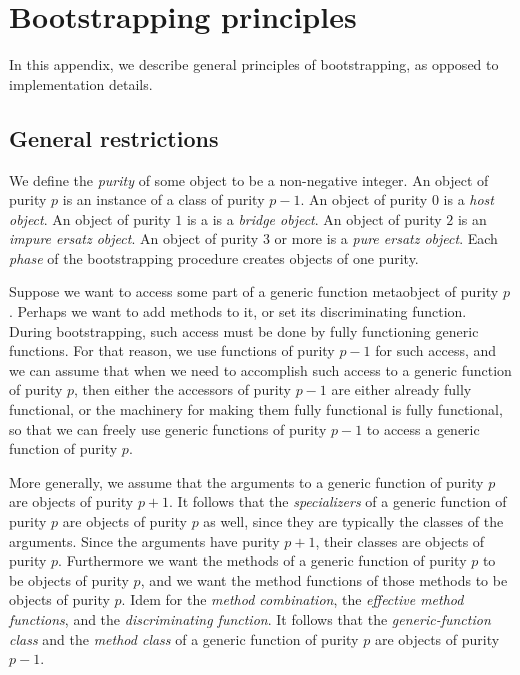 \chapter{Bootstrapping principles}

In this appendix, we describe general principles of bootstrapping, as
opposed to implementation details.

\section{General restrictions}

We define the \emph{purity} of some object to be a non-negative
integer.  An object of purity $p$ is an instance of a class of purity
$p-1$.  An object of purity $0$ is a \emph{host object}.  An object of
purity $1$ is a is a \emph{bridge object}.  An object of purity $2$ is
an \emph{impure ersatz object}.  An object of purity $3$ or more is a
\emph{pure ersatz object}.  Each \emph{phase} of the bootstrapping
procedure creates objects of one purity.

Suppose we want to access some part of a generic function metaobject
of purity $p$.  Perhaps we want to add methods to it, or set its
discriminating function.  During bootstrapping, such access must be
done by fully functioning generic functions.  For that reason, we use
functions of purity $p-1$ for such access, and we can assume that when
we need to accomplish such access to a generic function of purity $p$,
then either the accessors of purity $p-1$ are either already fully
functional, or the machinery for making them fully functional is fully
functional, so that we can freely use generic functions of purity
$p-1$ to access a generic function of purity $p$.

More generally, we assume that the arguments to a generic function of
purity $p$ are objects of purity $p+1$.  It follows that the
\emph{specializers} of a generic function of purity $p$ are objects of
purity $p$ as well, since they are typically the classes of the
arguments.  Since the arguments have purity $p+1$, their classes are
objects of purity $p$.  Furthermore we want the methods of a generic
function of purity $p$ to be objects of purity $p$, and we want the
method functions of those methods to be objects of purity $p$.  Idem
for the \emph{method combination}, the \emph{effective method
  functions}, and the \emph{discriminating function}.  It follows that
the \emph{generic-function class} and the \emph{method class} of a
generic function of purity $p$ are objects of purity $p-1$.

